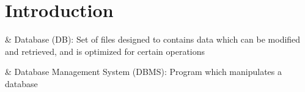 %
%
%

\section{Introduction}
	\label{sec:introduction}
\begin{easylist}

& Database (DB): Set of files designed to contains data which can be modified and retrieved, and is optimized for certain operations

& Database Management System (DBMS): Program which manipulates a database

\end{easylist}
\clearpage